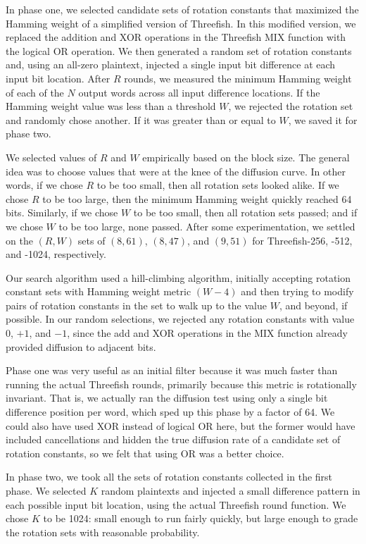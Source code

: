 \documentclass[11pt,twoside]{article}
\begin{document}
In phase one, we selected candidate sets of rotation constants that maximized the Hamming weight of a simplified version of Threefish.  In this modified version, we replaced the addition and XOR operations in the Threefish MIX function with the logical OR operation.  We then generated a random set of rotation constants and, using an all-zero plaintext, injected a single input bit difference at each input bit location.  After $R$ rounds, we measured the minimum Hamming weight of each of the $N$ output words across all input difference locations.  If the Hamming weight value was less than a threshold $W$, we rejected the rotation set and randomly chose another.  If it was greater than or equal to $W$, we saved it for phase two.

We selected values of $R$ and $W$ empirically based on the block size.  The general idea was to choose values that were at the knee of the diffusion curve.  In other words, if we chose $R$ to be too small, then all rotation sets looked alike.  If we chose $R$ to be too large, then the minimum Hamming weight quickly reached 64 bits.  Similarly, if we chose $W$ to be too small, then all rotation sets passed; and if we chose $W$ to be too large, none passed.  After some experimentation, we settled on the $(R,W)$ sets of $(8,61)$, $(8,47)$, and $(9,51)$ for Threefish-256, -512, and -1024, respectively.

Our search algorithm used a hill-climbing algorithm, initially accepting rotation constant sets with Hamming weight metric $(W-4)$ and then trying to modify pairs of rotation constants in the set to walk up to the value $W$, and beyond, if possible. In our random selections, we rejected any rotation constants with value $0$, $+1$, and $-1$, since the add and XOR operations in the MIX function already provided diffusion to adjacent bits.

Phase one was very useful as an initial filter because it was much faster than running the actual Threefish rounds, primarily because this metric is rotationally invariant. That is, we actually ran the diffusion test using only a single bit difference position per word, which sped up this phase by a factor of 64. We could also have used XOR instead of logical OR here, but the former would have included cancellations and hidden the true diffusion rate of a candidate set of rotation constants, so we felt that using OR was a better choice.

In phase two, we took all the sets of rotation constants collected in the first phase.  We selected $K$ random plaintexts and injected a small difference pattern in each possible input bit location, using the actual Threefish round function.  We chose $K$ to be 1024: small enough to run fairly quickly, but large enough to grade the rotation sets with reasonable probability.
\end{document}
